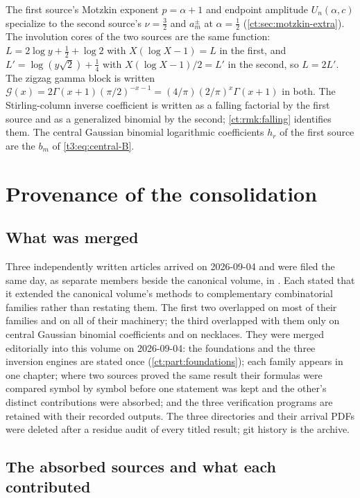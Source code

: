 \documentclass[11pt,openany]{book}
\numberwithin{equation}{chapter}
\theoremstyle{plain}
\theoremstyle{definition}
\theoremstyle{remark}
\begin{document}
The first source's Motzkin exponent $p=\alpha+1$ and endpoint amplitude
$U_n(\alpha,c)$ specialize to the second source's $\nu=\tfrac32$ and
$a^\pm_m$ at $\alpha=\tfrac12$ (\cref{ct:sec:motzkin-extra}).  The
involution cores of the two sources are the same function:
$L=2\log y+\tfrac12+\log2$ with $X(\log X-1)=L$ in the first, and
$L'=\log(y\sqrt2)+\tfrac14$ with $X(\log X-1)/2=L'$ in the second, so
$L=2L'$.  The zigzag gamma block is written $\mathcal G(x)=2\Gamma(x+1)(\pi/2)^{-x-1}
=(4/\pi)(2/\pi)^x\Gamma(x+1)$ in both.  The Stirling-column inverse
coefficient is written as a falling factorial by the first source and as a
generalized binomial by the second; \cref{ct:rmk:falling} identifies them.
The central Gaussian binomial logarithmic coefficients $h_r$ of the first
source are the $b_m$ of \cref{t3:eq:central-B}.


\chapter{Provenance of the consolidation}
\label{ct:app:provenance}

\section{What was merged}

Three independently written articles arrived on 2026-09-04 and were filed
the same day, as separate members beside the canonical volume, in
.  Each stated that it extended the
canonical volume's methods to complementary combinatorial families rather
than restating them.  The first two overlapped on most of their families and
on all of their machinery; the third overlapped with them only on central
Gaussian binomial coefficients and on necklaces.  They were merged
editorially into this volume on 2026-09-04: the foundations and the three
inversion engines are stated once (\cref{ct:part:foundations}); each family
appears in one chapter; where two sources proved the same result their
formulas were compared symbol by symbol before one statement was kept and
the other's distinct contributions were absorbed; and the three
verification programs are retained with their recorded outputs.  The three
directories and their arrival PDFs were deleted after a residue audit of
every titled result; git history is the archive.

\section{The absorbed sources and what each contributed}
\end{document}
